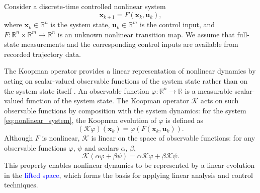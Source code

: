 \documentclass[journal]{IEEEtran}
\newcommand{\vx}{\mathbf{x}}
\newcommand{\vu}{\mathbf{u}}
\begin{document}
Consider a discrete-time controlled nonlinear system
\begin{equation}
    \vx_{k+1} = F(\vx_k, \vu_k),
    \label{eq:nonlinear_system}
\end{equation}
where $\vx_k \in \mathbb{R}^n$ is the system state, $\vu_k \in \mathbb{R}^m$ is the control input, and $F:\mathbb{R}^n \times \mathbb{R}^m \to \mathbb{R}^n$ is an unknown nonlinear transition map. We assume that full-state measurements and the corresponding control inputs are available from recorded trajectory data.

The Koopman operator provides a linear representation of nonlinear dynamics by acting on scalar-valued observable functions of the system state rather than on the system state itself \cite{koopman1931hamiltonian, mezic2005spectral, rowley2009spectral, brunton2022modern}. An observable function $\varphi:\mathbb{R}^n\to\mathbb{R}$ is a measurable scalar-valued function of the system state. The Koopman operator $\mathcal{K}$ acts on such observable functions by composition with the system dynamics: for the system \eqref{eq:nonlinear_system}, the Koopman evolution of $\varphi$ is defined as
\begin{equation}
    (\mathcal{K}\varphi)(\vx_k) = \varphi(F(\vx_k,\vu_k)).
    \label{eq:koopman_operator}
\end{equation}
Although $F$ is nonlinear, $\mathcal{K}$ is linear on the space of observable functions: for any observable functions $\varphi$, $\psi$ and scalars $\alpha$, $\beta$,
\begin{equation}
    \mathcal{K}(\alpha \varphi + \beta \psi)
    = \alpha \mathcal{K}\varphi + \beta \mathcal{K}\psi.
    \label{eq:koopman_linearity}
\end{equation}
This property enables nonlinear dynamics to be represented by a linear evolution in the \textcolor{blue}{lifted space}, which forms the basis for applying linear analysis and control techniques.
\end{document}
